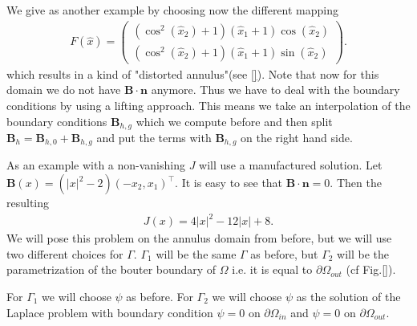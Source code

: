 \documentclass[../master_thesis.tex]{subfiles}
\begin{document}
We give as another example by choosing now the different mapping 
\begin{align*}
    F(\hat{x}) = \begin{pmatrix}
        (\cos^2(\hat{x}_2 ) + 1 )(\hat{x}_1 + 1)\cos(\hat{x}_2 ) 
        \\ (\cos^2(\hat{x}_2 ) + 1 ) (\hat{x}_1 + 1)\sin(\hat{x}_2 ) 
    \end{pmatrix}.
\end{align*}
which results in a kind of "distorted annulus"(see \ref{}). Note that now for this domain we do not have 
$\mathbf{B}\cdot \mathbf{n}$ anymore. Thus we have to deal with the boundary conditions 
by using a lifting approach. This means we take an interpolation of the boundary conditions 
$\mathbf{B}_{h,g}$ which we compute before and then split
$\mathbf{B}_{h} = \mathbf{B}_{h,0} + \mathbf{B}_{h,g}$ and put the terms 
with $\mathbf{B}_{h,g}$ on the right hand side. 

As an example with a non-vanishing $J$ will use a manufactured solution. 
Let $\mathbf{B}(x) = (|x|^2 -2) (-x_2,x_1)^\top$. It is easy to see that 
$\mathbf{B}\cdot \mathbf{n} = 0$. 
Then the resulting 
\begin{align*}
    J(x) = 4 |x|^2 - 12 |x| + 8.
\end{align*}
We will pose this problem on the annulus domain from before, but we will use two 
different choices for $\Gamma$. 
$\Gamma_1$ will be the same $\Gamma$ as before, but $\Gamma_2$ will 
be the parametrization of the bouter boundary of $\Omega$ i.e. 
it is equal to $\partial\Omega_{out}$ (cf Fig.\ref{}).

For $\Gamma_1$ we will choose $\psi$ as before. For $\Gamma_2$ we will choose 
$\psi$ as the solution of the Laplace problem with boundary condition 
$\psi=0$ on $\partial\Omega_{in}$ and $\psi=0$ on $\partial\Omega_{out}$.
\end{document}

